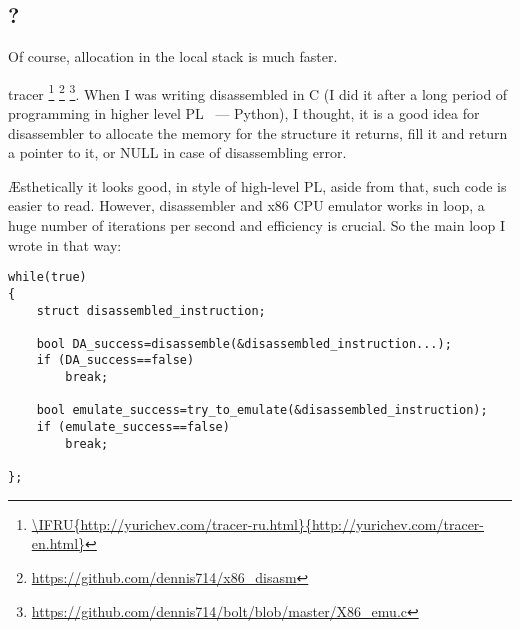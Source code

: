 ﻿\subsection{?}

{Of course, allocation in the local stack is much faster}.

 tracer
\footnote{\url{\IFRU{http://yurichev.com/tracer-ru.html}{http://yurichev.com/tracer-en.html}}}
\footnote{\url{https://github.com/dennis714/x86_disasm}} 
\footnote{\url{https://github.com/dennis714/bolt/blob/master/X86_emu.c}}.
{When I was writing disassembled in C (I did it after a long period of programming in higher level 
\ac{PL} ~---
Python), I thought, it is a good idea for disassembler to allocate the memory for the structure it returns,
fill it and return a pointer to it, or NULL in case of disassembling error}.

{\AE{}sthetically it looks good, in style of high-level \ac{PL}, aside from that, such code is easier to read}.
{However, disassembler and x86 CPU emulator works in loop, a huge number of iterations per second and efficiency
is crucial}.
{So the main loop I wrote in that way}:

\begin{lstlisting}
while(true)
{
	struct disassembled_instruction;

	bool DA_success=disassemble(&disassembled_instruction...);
	if (DA_success==false)
		break;

	bool emulate_success=try_to_emulate(&disassembled_instruction);
	if (emulate_success==false)
		break;

};
\end{lstlisting}

